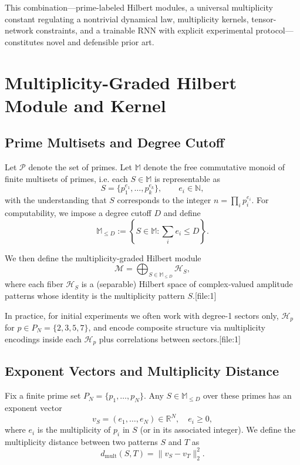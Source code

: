 \documentclass[11pt]{article}
\begin{document}
This combination---prime-labeled Hilbert modules, a universal multiplicity constant regulating a nontrivial dynamical law, multiplicity kernels, tensor-network constraints, and a trainable RNN with explicit experimental protocol---constitutes novel and defensible prior art.

\section{Multiplicity-Graded Hilbert Module and Kernel}

\subsection{Prime Multisets and Degree Cutoff}

Let $\mathcal{P}$ denote the set of primes. Let $\mathbb{M}$ denote the free commutative monoid of finite multisets of primes, i.e. each $S\in\mathbb{M}$ is representable as
\[
S = \{p_1^{e_1},\dots,p_k^{e_k}\},\qquad e_i\in\mathbb{N},
\]
with the understanding that $S$ corresponds to the integer $n=\prod_i p_i^{e_i}$. For computability, we impose a degree cutoff $D$ and define
\[
\mathbb{M}_{\le D} := \left\{ S\in \mathbb{M} : \sum_i e_i \le D\right\}.
\]

We then define the multiplicity-graded Hilbert module
\[
\mathcal{M} = \bigoplus_{S\in\mathbb{M}_{\le D}} \mathcal{H}_S,
\]
where each fiber $\mathcal{H}_S$ is a (separable) Hilbert space of complex-valued amplitude patterns whose identity is the multiplicity pattern $S$.[file:1]

In practice, for initial experiments we often work with degree-1 sectors only, $\mathcal{H}_p$ for $p\in P_N=\{2,3,5,7\}$, and encode composite structure via multiplicity encodings inside each $\mathcal{H}_p$ plus correlations between sectors.[file:1]

\subsection{Exponent Vectors and Multiplicity Distance}

Fix a finite prime set $P_N = \{p_1,\dots,p_N\}$. Any $S\in\mathbb{M}_{\le D}$ over these primes has an exponent vector
\[
v_S = (e_1,\dots,e_N)\in \mathbb{R}^N,\quad e_i\ge 0,
\]
where $e_i$ is the multiplicity of $p_i$ in $S$ (or in its associated integer). We define the multiplicity distance between two patterns $S$ and $T$ as
\[
d_{\mathrm{mult}}(S,T) = \|v_S - v_T\|_2^2.
\]
\end{document}

